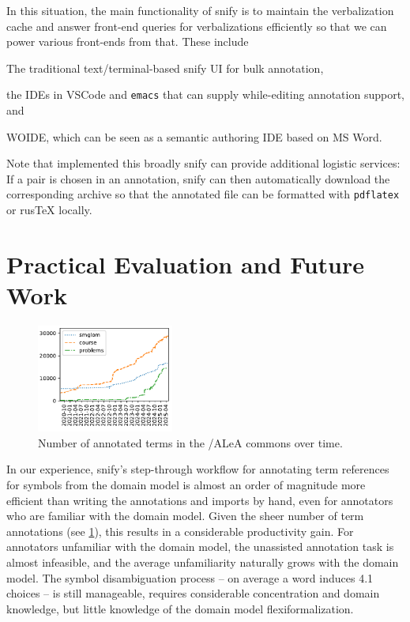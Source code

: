 \documentclass[runningheads]{llncs}
\newcommand\ALeA{\textsf{ALeA}\xspace}
\newcommand\snify{\textsf{snify}\xspace}
\begin{document}
In this situation, the main functionality of \snify is to maintain the verbalization cache
and answer front-end queries for verbalizations efficiently so that we can power various
front-ends from that. These include
\begin{compactenum}[\em i\rm)]
\item The traditional text/terminal-based \snify UI for bulk annotation,
\item the \sTeX IDEs in VSCode and \texttt{emacs} that can supply while-editing annotation
  support, and 
\item WOIDE, which can be seen as a semantic authoring IDE based on MS Word.
\end{compactenum}

Note that implemented this broadly \snify can provide additional logistic services: If a
pair is chosen in an annotation, \snify can then automatically download the corresponding
archive so that the annotated file can be formatted with \texttt{pdflatex} or
\textsf{rus\TeX} locally.

\section{Practical Evaluation and Future Work}\label{sec:eval}
\begin{figure}
  \centering
  \includegraphics[width=0.4\textwidth]{../img/annocounts.pdf}
  \caption{Number of annotated terms in the \sTeX/\ALeA commons over time.}\label{fig:annocounts}
\end{figure}
In our experience, \snify's step-through workflow for annotating term references for symbols
from the domain model is almost an order of magnitude more efficient than writing the
annotations and imports by hand, even for annotators who are familiar with the domain
model.
Given the sheer number of term annotations (see \cref{fig:annocounts}),
this results in a considerable productivity gain.
For annotators unfamiliar with the domain model, the unassisted annotation task is
almost infeasible, and the average unfamiliarity naturally grows with the domain
model. The symbol disambiguation process -- on average a word induces 4.1 choices
-- is still manageable,
requires considerable concentration and domain knowledge, but little knowledge of the
domain model flexiformalization.
\end{document}
